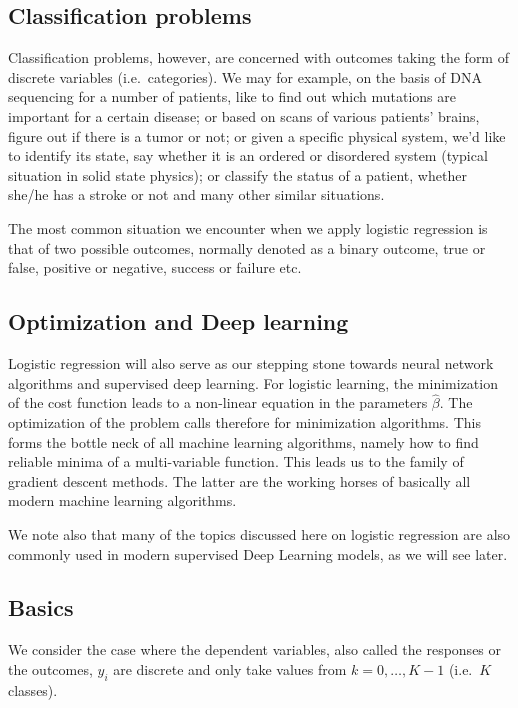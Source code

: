 \documentclass[%
oneside,                 %
final,                   %
10pt]{article}
\begin{document}
\subsection*{Classification problems}


Classification problems, however, are concerned with outcomes taking
the form of discrete variables (i.e.~categories). We may for example,
on the basis of DNA sequencing for a number of patients, like to find
out which mutations are important for a certain disease; or based on
scans of various patients' brains, figure out if there is a tumor or
not; or given a specific physical system, we'd like to identify its
state, say whether it is an ordered or disordered system (typical
situation in solid state physics); or classify the status of a
patient, whether she/he has a stroke or not and many other similar
situations.

The most common situation we encounter when we apply logistic
regression is that of two possible outcomes, normally denoted as a
binary outcome, true or false, positive or negative, success or
failure etc.

\subsection*{Optimization and Deep learning}

Logistic regression will also serve as our stepping stone towards
neural network algorithms and supervised deep learning. For logistic
learning, the minimization of the cost function leads to a non-linear
equation in the parameters $\hat{\beta}$. The optimization of the
problem calls therefore for minimization algorithms. This forms the
bottle neck of all machine learning algorithms, namely how to find
reliable minima of a multi-variable function. This leads us to the
family of gradient descent methods. The latter are the working horses
of basically all modern machine learning algorithms.

We note also that many of the topics discussed here on logistic 
regression are also commonly used in modern supervised Deep Learning
models, as we will see later.


\subsection*{Basics}

We consider the case where the dependent variables, also called the
responses or the outcomes, $y_i$ are discrete and only take values
from $k=0,\dots,K-1$ (i.e.~$K$ classes).
\end{document}
